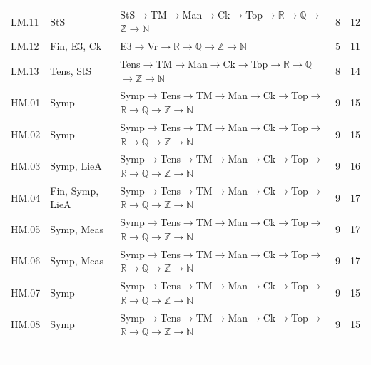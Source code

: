 {\begin{longtable}{l p{4.6cm} p{7.4cm} r r}
LM.11 & \textsf{StS} & \textsf{StS}$\to$\textsf{TM}$\to$\textsf{Man}$\to$\textsf{Ck}$\to$\textsf{Top}$\to$$\mathbb R$$\to$$\mathbb Q$$\to$$\mathbb Z$$\to$$\mathbb N$ & 8 & 12 \\
LM.12 & \textsf{Fin}, \textsf{E3}, \textsf{Ck} & \textsf{E3}$\to$\textsf{Vr}$\to$$\mathbb R$$\to$$\mathbb Q$$\to$$\mathbb Z$$\to$$\mathbb N$ & 5 & 11 \\
LM.13 & \textsf{Tens}, \textsf{StS} & \textsf{Tens}$\to$\textsf{TM}$\to$\textsf{Man}$\to$\textsf{Ck}$\to$\textsf{Top}$\to$$\mathbb R$$\to$$\mathbb Q$$\to$$\mathbb Z$$\to$$\mathbb N$ & 8 & 14 \\
HM.01 & \textsf{Symp} & \textsf{Symp}$\to$\textsf{Tens}$\to$\textsf{TM}$\to$\textsf{Man}$\to$\textsf{Ck}$\to$\textsf{Top}$\to$$\mathbb R$$\to$$\mathbb Q$$\to$$\mathbb Z$$\to$$\mathbb N$ & 9 & 15 \\
HM.02 & \textsf{Symp} & \textsf{Symp}$\to$\textsf{Tens}$\to$\textsf{TM}$\to$\textsf{Man}$\to$\textsf{Ck}$\to$\textsf{Top}$\to$$\mathbb R$$\to$$\mathbb Q$$\to$$\mathbb Z$$\to$$\mathbb N$ & 9 & 15 \\
HM.03 & \textsf{Symp}, \textsf{LieA} & \textsf{Symp}$\to$\textsf{Tens}$\to$\textsf{TM}$\to$\textsf{Man}$\to$\textsf{Ck}$\to$\textsf{Top}$\to$$\mathbb R$$\to$$\mathbb Q$$\to$$\mathbb Z$$\to$$\mathbb N$ & 9 & 16 \\
HM.04 & \textsf{Fin}, \textsf{Symp}, \textsf{LieA} & \textsf{Symp}$\to$\textsf{Tens}$\to$\textsf{TM}$\to$\textsf{Man}$\to$\textsf{Ck}$\to$\textsf{Top}$\to$$\mathbb R$$\to$$\mathbb Q$$\to$$\mathbb Z$$\to$$\mathbb N$ & 9 & 17 \\
HM.05 & \textsf{Symp}, \textsf{Meas} & \textsf{Symp}$\to$\textsf{Tens}$\to$\textsf{TM}$\to$\textsf{Man}$\to$\textsf{Ck}$\to$\textsf{Top}$\to$$\mathbb R$$\to$$\mathbb Q$$\to$$\mathbb Z$$\to$$\mathbb N$ & 9 & 17 \\
HM.06 & \textsf{Symp}, \textsf{Meas} & \textsf{Symp}$\to$\textsf{Tens}$\to$\textsf{TM}$\to$\textsf{Man}$\to$\textsf{Ck}$\to$\textsf{Top}$\to$$\mathbb R$$\to$$\mathbb Q$$\to$$\mathbb Z$$\to$$\mathbb N$ & 9 & 17 \\
HM.07 & \textsf{Symp} & \textsf{Symp}$\to$\textsf{Tens}$\to$\textsf{TM}$\to$\textsf{Man}$\to$\textsf{Ck}$\to$\textsf{Top}$\to$$\mathbb R$$\to$$\mathbb Q$$\to$$\mathbb Z$$\to$$\mathbb N$ & 9 & 15 \\
HM.08 & \textsf{Symp} & \textsf{Symp}$\to$\textsf{Tens}$\to$\textsf{TM}$\to$\textsf{Man}$\to$\textsf{Ck}$\to$\textsf{Top}$\to$$\mathbb R$$\to$$\mathbb Q$$\to$$\mathbb Z$$\to$$\mathbb N$ & 9 & 15 \\
$$
\end{longtable}}
